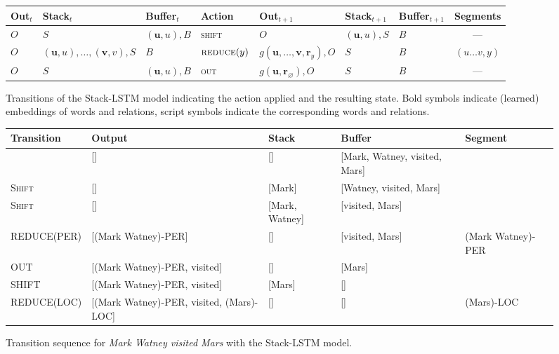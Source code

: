 \documentclass[11pt,letterpaper]{article}
\newcommand{\ignore}[1]{}
\newcommand{\guillaumecomment}[1]{\ignore{\textcolor{orange}{\textbf{[#1 --\textsc{GL}]}}}}
\begin{document}
\begin{figure}
\begin{small}
\centering
\begin{tabular}{lll|l|lll|c}
\textbf{Out}$_t$ & \textbf{Stack}$_t$ & \textbf{Buffer}$_t$ & \textbf{Action} & \textbf{Out}$_{t+1}$ & \textbf{Stack}$_{t+1}$ & \textbf{Buffer}$_{t+1}$ & \textbf{Segments} \\
\hline
$O$ & $S$ & $(\mathbf{u},u),B$ & \textsc{shift} & $O$ & $(\mathbf{u},u),S$ & $B$ & --- \\ %
$O$ & $(\mathbf{u},u),\ldots,(\mathbf{v},v),S$ & $B$  &$\textsc{reduce}(y)$ & $g(\mathbf{u},\ldots,\mathbf{v},\mathbf{r}_y),O$ & $S$ & $B$ & $(u\ldots v,y)$ \\
$O$ & $S$ & $(\mathbf{u},u),B$ & \textsc{out} & $g(\mathbf{u},\mathbf{r}_{\varnothing}),O$ & $S$ & $B$ & ---
\end{tabular}
\end{small}
\caption{Transitions of the Stack-LSTM model indicating the action applied and the resulting state. \guillaumecomment{this first sentence is maybe a little bit confusing} Bold symbols indicate (learned) embeddings of words and relations, script symbols indicate the corresponding words and relations.}
\label{fig:parser}
\end{figure}

\begin{figure}[t]
  \begin{center}
    \centering
    \begin{scriptsize}
      \begin{tabular}{lllll}\textbf{Transition}&\textbf{Output}&\textbf{Stack}&\textbf{Buffer}&\textbf{Segment}\\
      \hline
        &[]&[]&[Mark, Watney, visited, Mars]&\\
        \textsc{Shift}&[]&[Mark]&[Watney, visited, Mars]&\\
        \textsc{Shift}&[]&[Mark, Watney]&[visited, Mars]&\\
        \textsc{REDUCE(PER)}&[(Mark Watney)-PER]&[]&[visited, Mars]& (Mark Watney)-PER\\
        \textsc{OUT}&[(Mark Watney)-PER, visited]&[]&[Mars]&\\
        \textsc{SHIFT}&[(Mark Watney)-PER, visited]&[Mars]&[]&\\
        \textsc{REDUCE(LOC)}&[(Mark Watney)-PER, visited, (Mars)-LOC]&[]&[]& (Mars)-LOC\\
      \end{tabular}
    \end{scriptsize}
    \caption{Transition sequence for \emph{Mark Watney visited Mars} with the Stack-LSTM model.}
    \label{parsingexample}
  \end{center}
\end{figure}
\end{document}
